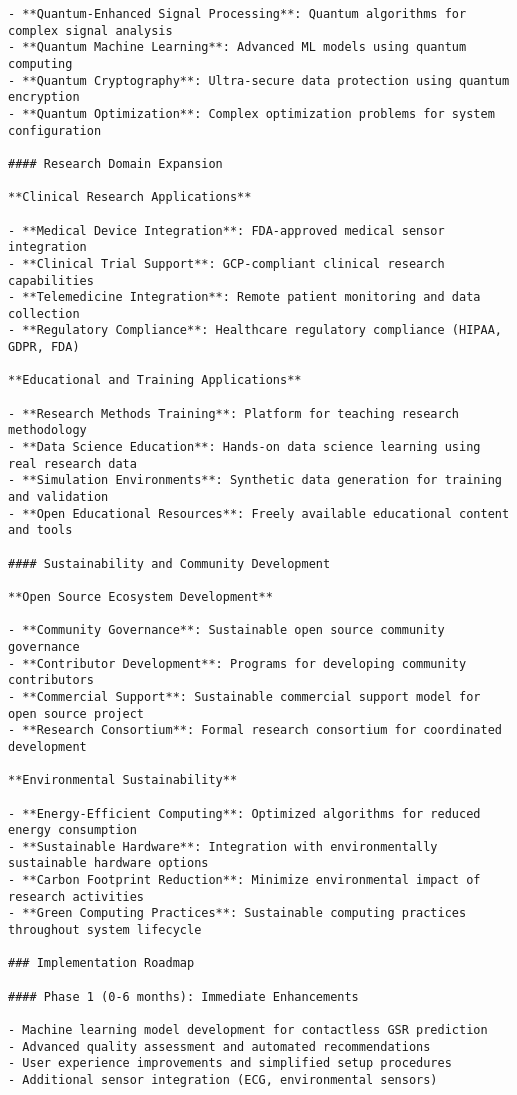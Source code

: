 \documentclass[12pt,a4paper]{report}
\begin{document}
\begin{verbatim}
- **Quantum-Enhanced Signal Processing**: Quantum algorithms for complex signal analysis
- **Quantum Machine Learning**: Advanced ML models using quantum computing
- **Quantum Cryptography**: Ultra-secure data protection using quantum encryption
- **Quantum Optimization**: Complex optimization problems for system configuration

#### Research Domain Expansion

**Clinical Research Applications**

- **Medical Device Integration**: FDA-approved medical sensor integration
- **Clinical Trial Support**: GCP-compliant clinical research capabilities
- **Telemedicine Integration**: Remote patient monitoring and data collection
- **Regulatory Compliance**: Healthcare regulatory compliance (HIPAA, GDPR, FDA)

**Educational and Training Applications**

- **Research Methods Training**: Platform for teaching research methodology
- **Data Science Education**: Hands-on data science learning using real research data
- **Simulation Environments**: Synthetic data generation for training and validation
- **Open Educational Resources**: Freely available educational content and tools

#### Sustainability and Community Development

**Open Source Ecosystem Development**

- **Community Governance**: Sustainable open source community governance
- **Contributor Development**: Programs for developing community contributors
- **Commercial Support**: Sustainable commercial support model for open source project
- **Research Consortium**: Formal research consortium for coordinated development

**Environmental Sustainability**

- **Energy-Efficient Computing**: Optimized algorithms for reduced energy consumption
- **Sustainable Hardware**: Integration with environmentally sustainable hardware options
- **Carbon Footprint Reduction**: Minimize environmental impact of research activities
- **Green Computing Practices**: Sustainable computing practices throughout system lifecycle

### Implementation Roadmap

#### Phase 1 (0-6 months): Immediate Enhancements

- Machine learning model development for contactless GSR prediction
- Advanced quality assessment and automated recommendations
- User experience improvements and simplified setup procedures
- Additional sensor integration (ECG, environmental sensors)


\end{verbatim}
\end{document}

